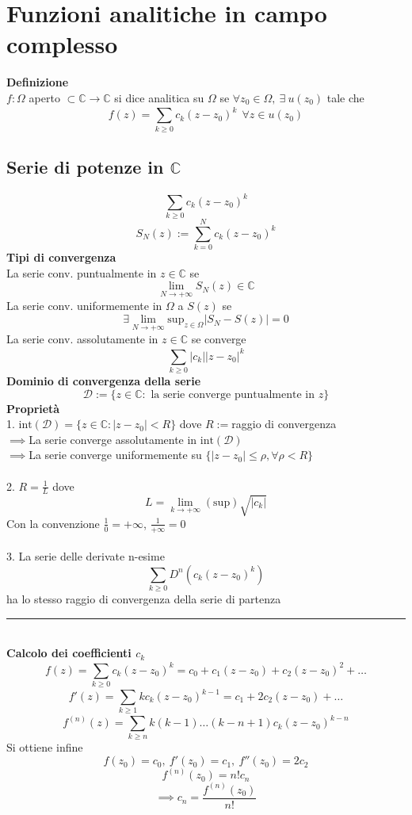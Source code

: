 \documentclass[a4paper]{article}
\newcommand{\C}{\mathbb{C}}
\newcommand{\divider}{\noindent\rule{\textwidth}{0.5pt}}
\begin{document}
\section{Funzioni analitiche in campo complesso}
\begin{tcolorbox}	
\textbf{Definizione} 
\\ $f:\Omega$ aperto $\subset \C\to \C$ si dice analitica su $\Omega$ se $\forall z_0\in\Omega,\ \exists\ u(z_0)$ tale che
\[f(z)=\sum_{k\ge 0}^{} c_k(z-z_0)^k\ \ \forall z\in u(z_0)\]
\end{tcolorbox}
\subsection{Serie di potenze in $\C$}
\[\sum_{k\ge 0}^{} c_k(z-z_0)^k\]
\[S_N(z):=\sum_{k=0}^{N} c_k(z-z_0)^k\]
\textbf{Tipi di convergenza}\\ 
La serie conv. puntualmente in $z\in\C$ se \[\lim_{N \to + \infty} S_N(z)\in\C\]
La serie conv. uniformemente in $\Omega$ a $S(z)$ se \[\exists\lim_{N \to +\infty} \text{sup}_{z\in\Omega}|S_N-S(z)|=0\]
La serie conv. assolutamente in $z\in\C$ se converge \[\sum_{k\ge 0}^{} |c_k| |z-z_0|^k\]
\textbf{Dominio di convergenza della serie} 
\[\mathcal D:=\{z\in\C:\text{ la serie converge puntualmente in }z\}\] 
\textbf{Proprietà} 
\\1. $\text{int}(\mathcal D)=\{z\in\C: |z-z_0|<R\}$ dove $R:=$raggio di convergenza
\\$\implies$La serie converge assolutamente in $\text{int}(\mathcal D)$
\\$\implies$La serie converge uniformemente su $\{|z-z_0|\le \rho,\forall\rho<R\} $
\\
\\2. $R=\frac{1}{L}$ dove \[L=\lim_{k \to +\infty} (\text{sup})\sqrt{|c_k|} \]
Con la convenzione $\frac{1}{0}=+\infty$, $\frac{1}{+\infty}=0$
\\\\3. La serie delle derivate n-esime
\[\sum_{k\ge 0}^{} D^n(c_k(z-z_0)^k)\]
ha lo stesso raggio di convergenza della serie di partenza
\\\divider
\\\textbf{Calcolo dei coefficienti $c_k$} 
\[f(z)=\sum_{k\ge 0}^{} c_k(z-z_0)^k=c_0+c_1(z-z_0)+c_2(z-z_0)^2+\ldots\]
\[f'(z)=\sum_{k\ge 1}^{} kc_k(z-z_0)^{k-1}=c_1+2c_2(z-z_0)+\ldots\]
\[f^{(n)}(z)=\sum_{k\ge n}^{} k(k-1)\ldots(k-n+1)c_k(z-z_0)^{k-n}\]
Si ottiene infine
\[f(z_0)=c_0,\ f'(z_0)=c_1,\ f''(z_0)=2c_2\]
\[f^{(n)}(z_0)=n!c_n\]
\[\implies c_n=\frac{f^{(n)}(z_0)}{n!}
\]
\end{document}
